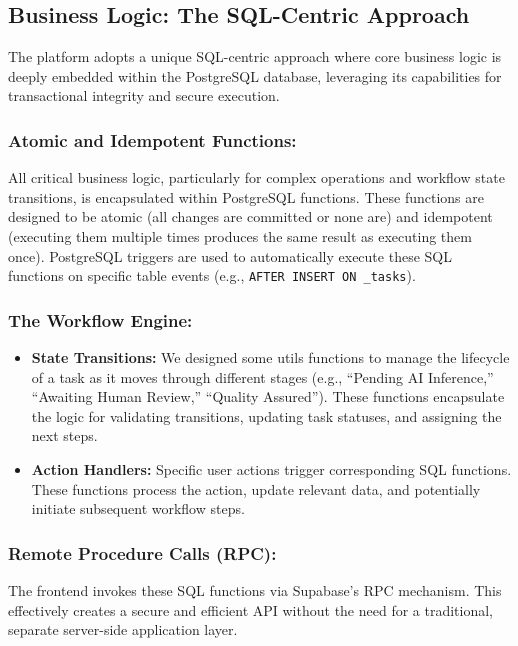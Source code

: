 \subsection{Business Logic: The SQL-Centric Approach}

The platform adopts a unique SQL-centric approach where core business logic is deeply embedded within the PostgreSQL database, leveraging its capabilities for transactional integrity and secure execution.

\subsubsection*{Atomic and Idempotent Functions:} 
All critical business logic, particularly for complex operations and workflow state transitions, is encapsulated within PostgreSQL functions. These functions are designed to be atomic (all changes are committed or none are) and idempotent (executing them multiple times produces the same result as executing them once). PostgreSQL triggers are used to automatically execute these SQL functions on specific table events (e.g., \texttt{AFTER INSERT ON \_tasks}).

\subsubsection*{The Workflow Engine:}
\begin{itemize}
    \item \textbf{State Transitions:} We designed some utils functions to manage the lifecycle of a task as it moves through different stages (e.g., ``Pending AI Inference,'' ``Awaiting Human Review,'' ``Quality Assured''). These functions encapsulate the logic for validating transitions, updating task statuses, and assigning the next steps.
    \item \textbf{Action Handlers:} Specific user actions trigger corresponding SQL functions. These functions process the action, update relevant data, and potentially initiate subsequent workflow steps.
\end{itemize}

\subsubsection*{Remote Procedure Calls (RPC):} 
The frontend invokes these SQL functions via Supabase's RPC mechanism. This effectively creates a secure and efficient API without the need for a traditional, separate server-side application layer.

